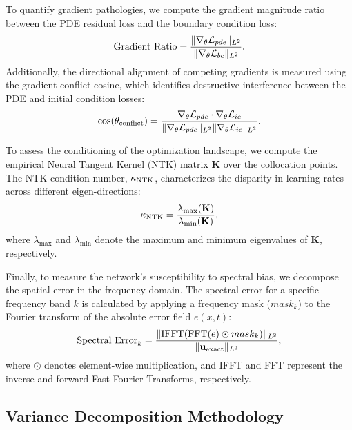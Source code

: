 To quantify gradient pathologies, we compute the gradient magnitude ratio between the PDE residual loss and the boundary condition loss:
\begin{equation}
    \text{Gradient Ratio} = \frac{\|\nabla_\theta \mathcal{L}_{pde}\|_{L^2}}{\|\nabla_\theta \mathcal{L}_{bc}\|_{L^2}}.
\end{equation}
Additionally, the directional alignment of competing gradients is measured using the gradient conflict cosine, which identifies destructive interference between the PDE and initial condition losses:
\begin{equation}
    \cos(\theta_{\text{conflict}}) = \frac{\nabla_\theta \mathcal{L}_{pde} \cdot \nabla_\theta \mathcal{L}_{ic}}{\|\nabla_\theta \mathcal{L}_{pde}\|_{L^2} \|\nabla_\theta \mathcal{L}_{ic}\|_{L^2}}.
\end{equation}

To assess the conditioning of the optimization landscape, we compute the empirical Neural Tangent Kernel (NTK) matrix $\mathbf{K}$ over the collocation points. The NTK condition number, $\kappa_{\mathrm{NTK}}$, characterizes the disparity in learning rates across different eigen-directions:
\begin{equation}
    \kappa_{\mathrm{NTK}} = \frac{\lambda_{\max}(\mathbf{K})}{\lambda_{\min}(\mathbf{K})},
\end{equation}
where $\lambda_{\max}$ and $\lambda_{\min}$ denote the maximum and minimum eigenvalues of $\mathbf{K}$, respectively.

Finally, to measure the network's susceptibility to spectral bias, we decompose the spatial error in the frequency domain. The spectral error for a specific frequency band $k$ is calculated by applying a frequency mask ($mask_k$) to the Fourier transform of the absolute error field $e(x,t)$:
\begin{equation}
    \text{Spectral Error}_k = \frac{\|\text{IFFT}(\text{FFT}(e) \odot mask_k)\|_{L^2}}{\|\mathbf{u}_{\text{exact}}\|_{L^2}},
\end{equation}
where $\odot$ denotes element-wise multiplication, and IFFT and FFT represent the inverse and forward Fast Fourier Transforms, respectively.

\subsection{Variance Decomposition Methodology}

